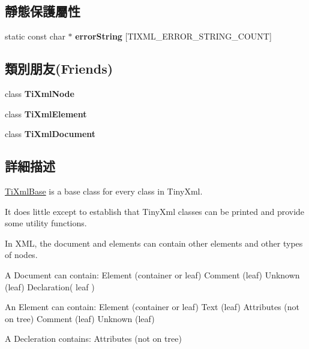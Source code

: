 \subsection*{靜態保護屬性}
\begin{DoxyCompactItemize}
\item 
static const char $\ast$ {\bfseries error\+String} \mbox{[}T\+I\+X\+M\+L\+\_\+\+E\+R\+R\+O\+R\+\_\+\+S\+T\+R\+I\+N\+G\+\_\+\+C\+O\+U\+NT\mbox{]}
\end{DoxyCompactItemize}
\subsection*{類別朋友(Friends)}
\begin{DoxyCompactItemize}
\item 
class {\bfseries Ti\+Xml\+Node}\hypertarget{class_ti_xml_base_a218872a0d985ae30e78c55adc4bdb196}{}\label{class_ti_xml_base_a218872a0d985ae30e78c55adc4bdb196}

\item 
class {\bfseries Ti\+Xml\+Element}\hypertarget{class_ti_xml_base_ab6592e32cb9132be517cc12a70564c4b}{}\label{class_ti_xml_base_ab6592e32cb9132be517cc12a70564c4b}

\item 
class {\bfseries Ti\+Xml\+Document}\hypertarget{class_ti_xml_base_a173617f6dfe902cf484ce5552b950475}{}\label{class_ti_xml_base_a173617f6dfe902cf484ce5552b950475}

\end{DoxyCompactItemize}


\subsection{詳細描述}
\hyperlink{class_ti_xml_base}{Ti\+Xml\+Base} is a base class for every class in Tiny\+Xml. 

It does little except to establish that Tiny\+Xml classes can be printed and provide some utility functions.

In X\+ML, the document and elements can contain other elements and other types of nodes.

\begin{DoxyVerb}A Document can contain: Element (container or leaf)
                        Comment (leaf)
                        Unknown (leaf)
                        Declaration( leaf )

An Element can contain: Element (container or leaf)
                        Text    (leaf)
                        Attributes (not on tree)
                        Comment (leaf)
                        Unknown (leaf)

A Decleration contains: Attributes (not on tree)
\end{DoxyVerb}
 

